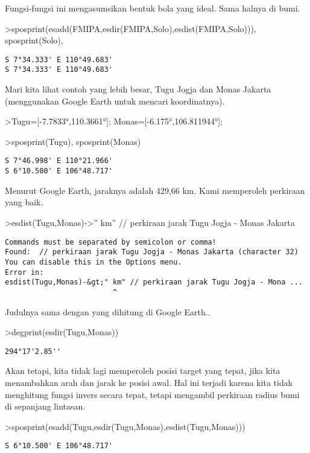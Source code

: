 \documentclass[
]{book}
\begin{document}
Fungsi-fungsi ini mengasumsikan bentuk bola yang ideal. Sama halnya di bumi.

\textgreater sposprint(esadd(FMIPA,esdir(FMIPA,Solo),esdist(FMIPA,Solo))), sposprint(Solo),

\begin{verbatim}
S 7°34.333' E 110°49.683'
S 7°34.333' E 110°49.683'
\end{verbatim}

Mari kita lihat contoh yang lebih besar, Tugu Jogja dan Monas Jakarta (menggunakan Google Earth untuk mencari koordinatnya).

\textgreater Tugu={[}-7.7833°,110.3661°{]}; Monas={[}-6.175°,106.811944°{]};

\textgreater sposprint(Tugu), sposprint(Monas)

\begin{verbatim}
S 7°46.998' E 110°21.966'
S 6°10.500' E 106°48.717'
\end{verbatim}

Menurut Google Earth, jaraknya adalah 429,66 km. Kami memperoleh perkiraan yang baik.

\textgreater esdist(Tugu,Monas)-\textgreater'' km'' // perkiraan jarak Tugu Jogja - Monas Jakarta

\begin{verbatim}
Commands must be separated by semicolon or comma!
Found:  // perkiraan jarak Tugu Jogja - Monas Jakarta (character 32)
You can disable this in the Options menu.
Error in:
esdist(Tugu,Monas)-&gt;" km" // perkiraan jarak Tugu Jogja - Mona ...
                         ^
\end{verbatim}

Judulnya sama dengan yang dihitung di Google Earth..

\textgreater degprint(esdir(Tugu,Monas))

\begin{verbatim}
294°17'2.85''
\end{verbatim}

Akan tetapi, kita tidak lagi memperoleh posisi target yang tepat, jika kita menambahkan arah dan jarak ke posisi awal. Hal ini terjadi karena kita tidak menghitung fungsi invers secara tepat, tetapi mengambil perkiraan radius bumi di sepanjang lintasan.

\textgreater sposprint(esadd(Tugu,esdir(Tugu,Monas),esdist(Tugu,Monas)))

\begin{verbatim}
S 6°10.500' E 106°48.717'
\end{verbatim}
\end{document}
